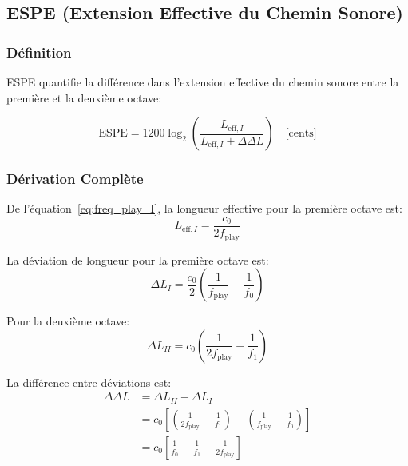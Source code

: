\documentclass[12pt,a4paper,twocolumn]{article}
\newcommand{\freqzero}{f_0}
\newcommand{\freqone}{f_1}
\newcommand{\freqplay}{f_{\text{play}}}
\begin{document}
\subsection{ESPE (Extension Effective du Chemin Sonore)}

\subsubsection{Définition}

ESPE quantifie la différence dans l'extension effective du chemin sonore entre la première et la deuxième octave:

\begin{equation}
\text{ESPE} = 1200 \log_2\left(\frac{L_{\text{eff},I}}{L_{\text{eff},I} + \Delta\Delta L}\right) \quad \text{[cents]}
\label{eq:espe_def}
\end{equation}

\subsubsection{Dérivation Complète}

De l'équation~\eqref{eq:freq_play_I}, la longueur effective pour la première octave est:
\begin{equation}
L_{\text{eff},I} = \frac{c_0}{2 \freqplay}
\label{eq:longueur_effective_I}
\end{equation}

La déviation de longueur pour la première octave est:
\begin{equation}
\Delta L_I = \frac{c_0}{2}\left(\frac{1}{\freqplay} - \frac{1}{\freqzero}\right)
\label{eq:delta_L_I}
\end{equation}

Pour la deuxième octave:
\begin{equation}
\Delta L_{II} = c_0\left(\frac{1}{2\freqplay} - \frac{1}{\freqone}\right)
\label{eq:delta_L_II}
\end{equation}

La différence entre déviations est:
\begin{align}
\Delta\Delta L &= \Delta L_{II} - \Delta L_I \\
&= c_0\left[\left(\frac{1}{2\freqplay} - \frac{1}{\freqone}\right) - \left(\frac{1}{\freqplay} - \frac{1}{\freqzero}\right)\right] \\
&= c_0\left[\frac{1}{\freqzero} - \frac{1}{\freqone} - \frac{1}{2\freqplay}\right]
\label{eq:delta_delta_L_espe}
\end{align}
\end{document}

